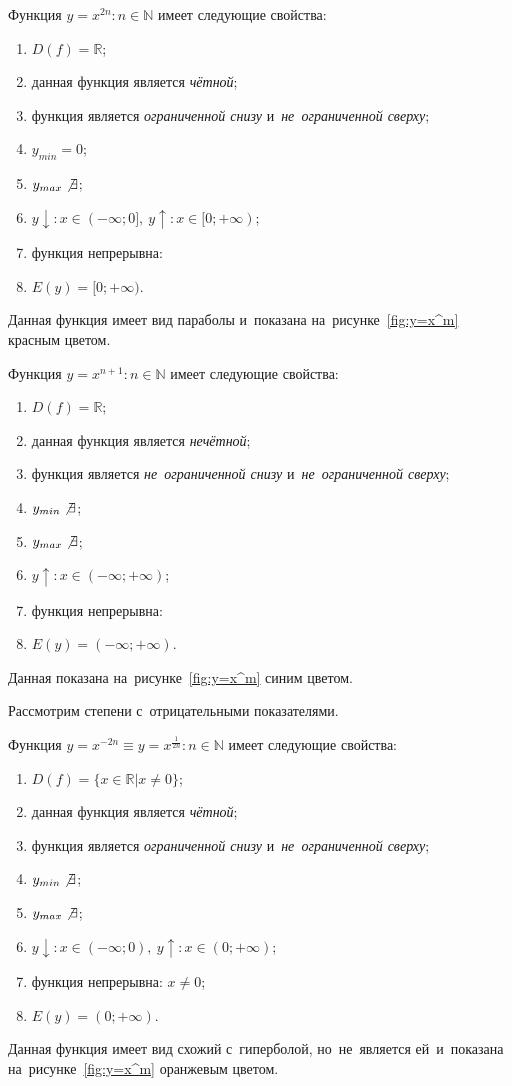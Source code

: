 \documentclass[]{scrartcl}
\begin{document}
Функция ${\textstyle y=x^{2n}: n \in \mathbb{N}}$ имеет следующие свойства:
\begin{enumerate}
	\item ${\textstyle D(f)=\mathbb{R}}$;
	\item данная функция является \emph{чётной};
	\item функция является \emph{ограниченной снизу} и~\emph{не~ограниченной сверху};
	\item ${\textstyle y_{min}=0}$;
	\item ${\textstyle y_{max}\not \exists}$;
	\item ${\textstyle y\downarrow:x\in (-\infty;0],\ y\uparrow:x\in [0;+\infty)}$;
	\item функция непрерывна:
	\item ${\textstyle E(y)=[0;+\infty)}$.
\end{enumerate}
Данная функция имеет вид параболы и~показана на~рисунке~\ref{fig:y=x^m} красным цветом.

Функция ${\textstyle y=x^{n+1}: n \in \mathbb{N}}$ имеет следующие свойства:
\begin{enumerate}
	\item ${\textstyle D(f)=\mathbb{R}}$;
	\item данная функция является \emph{нечётной};
	\item функция является \emph{не~ограниченной снизу} и~\emph{не~ограниченной сверху};
	\item ${\textstyle y_{min}\not \exists}$;
	\item ${\textstyle y_{max}\not \exists}$;
	\item ${\textstyle y\uparrow:x\in (-\infty;+\infty)}$;
	\item функция непрерывна:
	\item ${\textstyle E(y)=(-\infty;+\infty)}$.
\end{enumerate}
Данная показана на~рисунке~\ref{fig:y=x^m} синим цветом.

Рассмотрим степени с~отрицательными показателями.

Функция ${\textstyle y=x^{-2n} \equiv y=x^{\frac{1}{2n}} : n \in \mathbb{N}}$ имеет следующие свойства:
\begin{enumerate}
	\item ${\textstyle D(f)=\{x \in \mathbb{R} | x \neq 0\}}$;
	\item данная функция является \emph{чётной};
	\item функция является \emph{ограниченной снизу} и~\emph{не~ограниченной сверху};
	\item ${\textstyle y_{min}\not \exists}$;
	\item ${\textstyle y_{max}\not \exists}$;
	\item ${\textstyle y\downarrow:x\in (-\infty;0),\ y\uparrow:x\in (0;+\infty)}$;
	\item функция непрерывна: ${\textstyle x \neq 0}$;
	\item ${\textstyle E(y)=(0;+\infty)}$.
\end{enumerate}
Данная функция имеет вид схожий с~гиперболой, но~не~является ей~и~показана на~рисунке~\ref{fig:y=x^m} оранжевым цветом.
\end{document}
